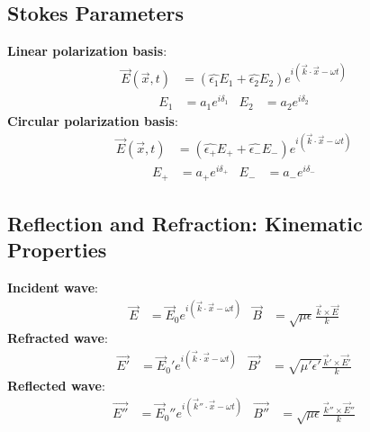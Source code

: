 \documentclass[a4paper, 11pt, landscape]{article}
\begin{document}
\begin{multicols*}{3}
\subsection{Stokes Parameters}
\begin{compactenum}
	\textbf{Linear polarization basis}:
	\begin{align*}
	    \vec{E}(\vec{x}, t) &= (\hat{\epsilon_{1}}E_{1} + \hat{\epsilon_{2}}E_{2})e^{i(\vec{k}\cdot\vec{x} - \omega t)}   
	\end{align*}
	\begin{align*}
	    E_{1} &= a_{1}e^{i\delta_{1}} & E_{2} &= a_{2}e^{i\delta_{2}}
	\end{align*}
	\textbf{Circular polarization basis}:
	\begin{align*}
	    \vec{E}(\vec{x}, t) &= (\hat{\epsilon_{+}}E_{+} +             \hat{\epsilon_{-}}E_{-})e^{i(\vec{k}\cdot\vec{x} - \omega t)}   
	\end{align*}
	\begin{align*}
	    E_{+} &= a_{+}e^{i\delta_{+}} & E_{-} &= a_{-}e^{i\delta_{-}}
	\end{align*}
\end{compactenum}

\subsection{Reflection and Refraction: Kinematic Properties}
\begin{compactenum}
	\textbf{Incident wave}:
		\begin{align*}
	        \vec{E} &= \vec{E}_{0}e^{i(\vec{k}\cdot\vec{x} - \omega t)} &
	        \vec{B} &= \sqrt{\mu \epsilon}\frac{\vec{k}\times\vec{E}}{k}
	    \end{align*}
	\textbf{Refracted wave}:
		\begin{align*}
	        \vec{E'} &= \vec{E}_{0}'e^{i(\vec{k}\cdot\vec{x} - \omega t)} &
	        \vec{B'} &= \sqrt{\mu' \epsilon'}\frac{\vec{k}'\times\vec{E}'}{k}
	    \end{align*}
	\textbf{Reflected wave}:
		\begin{align*}
	        \vec{E''} &= \vec{E}_{0}''e^{i(\vec{k}''\cdot\vec{x} - \omega t)} &
	        \vec{B''} &= \sqrt{\mu \epsilon}\frac{\vec{k}''\times\vec{E}''}{k}
	    \end{align*}
\end{compactenum}


\end{multicols*}
\end{document}
